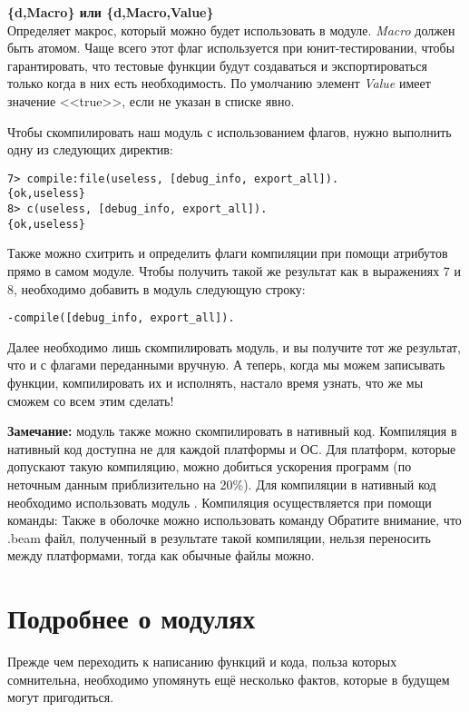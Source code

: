 \begin{minipage}{0.9\linewidth}
    \textbf{\{d,Macro\} или \{d,Macro,Value\}}\\ 
    Определяет макрос, который можно будет использовать в модуле.
    \emph{Macro} должен быть атомом.
    Чаще всего этот флаг используется при юнит\--тестировании, чтобы гарантировать, что тестовые функции будут создаваться и экспортироваться только когда в них есть необходимость.
    По умолчанию элемент \emph{Value} имеет значение <<true>>, если не указан в списке явно.
\end{minipage}

Чтобы скомпилировать наш модуль  с использованием флагов, нужно выполнить одну из следующих директив:
\begin{lstlisting}[style=erlang]
7> compile:file(useless, [debug_info, export_all]).
{ok,useless}
8> c(useless, [debug_info, export_all]).
{ok,useless}
\end{lstlisting}

Также можно схитрить и определить флаги компиляции при помощи атрибутов прямо в самом модуле.
Чтобы получить такой же результат как в выражениях 7 и 8, необходимо добавить в модуль следующую строку: 
\begin{lstlisting}[style=erlang]
-compile([debug_info, export_all]).
\end{lstlisting}

Далее необходимо лишь скомпилировать модуль, и вы получите тот же результат, что и с флагами переданными вручную.
А теперь, когда мы можем записывать функции, компилировать их и исполнять, настало время узнать, что же мы сможем со всем этим сделать!\\ 
\colorbox{lgray}
{
    \begin{minipage}{1\linewidth}
        \textbf{Замечание:} модуль также можно скомпилировать в нативный код.
        Компиляция в нативный код доступна не для каждой платформы и ОС.
        Для платформ, которые допускают такую компиляцию, можно добиться ускорения программ (по неточным данным приблизительно на 20\%).
        Для компиляции в нативный код необходимо использовать модуль . Компиляция осуществляется при помощи команды: 
        Также в оболочке можно использовать команду 
        Обратите внимание, что .beam файл, полученный в результате такой компиляции, нельзя переносить между платформами, тогда как обычные файлы можно.
    \end{minipage}
}
\section{Подробнее о модулях}
Прежде чем переходить к написанию функций и кода, польза которых сомнительна, необходимо упомянуть ещё несколько фактов, которые в будущем могут пригодиться.

